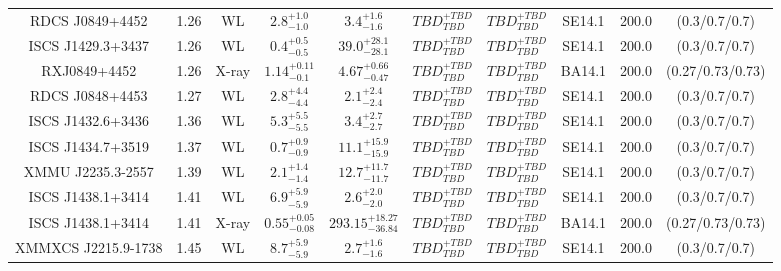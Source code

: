 \begin{table}
\begin{tabular}{cccccccccc}
RDCS J0849+4452 & 1.26 & WL & ${2.8}^{+1.0}_{-1.0}$ & ${3.4}^{+1.6}_{-1.6}$ & ${TBD}^{+TBD}_{TBD}$ & ${TBD}^{+TBD}_{TBD}$ & SE14.1 & 200.0 & (0.3/0.7/0.7) \\
ISCS J1429.3+3437 & 1.26 & WL & ${0.4}^{+0.5}_{-0.5}$ & ${39.0}^{+28.1}_{-28.1}$ & ${TBD}^{+TBD}_{TBD}$ & ${TBD}^{+TBD}_{TBD}$ & SE14.1 & 200.0 & (0.3/0.7/0.7) \\
RXJ0849+4452 & 1.26 & X-ray & ${1.14}^{+0.11}_{-0.1}$ & ${4.67}^{+0.66}_{-0.47}$ & ${TBD}^{+TBD}_{TBD}$ & ${TBD}^{+TBD}_{TBD}$ & BA14.1 & 200.0 & (0.27/0.73/0.73) \\
RDCS J0848+4453 & 1.27 & WL & ${2.8}^{+4.4}_{-4.4}$ & ${2.1}^{+2.4}_{-2.4}$ & ${TBD}^{+TBD}_{TBD}$ & ${TBD}^{+TBD}_{TBD}$ & SE14.1 & 200.0 & (0.3/0.7/0.7) \\
ISCS J1432.6+3436 & 1.36 & WL & ${5.3}^{+5.5}_{-5.5}$ & ${3.4}^{+2.7}_{-2.7}$ & ${TBD}^{+TBD}_{TBD}$ & ${TBD}^{+TBD}_{TBD}$ & SE14.1 & 200.0 & (0.3/0.7/0.7) \\
ISCS J1434.7+3519 & 1.37 & WL & ${0.7}^{+0.9}_{-0.9}$ & ${11.1}^{+15.9}_{-15.9}$ & ${TBD}^{+TBD}_{TBD}$ & ${TBD}^{+TBD}_{TBD}$ & SE14.1 & 200.0 & (0.3/0.7/0.7) \\
XMMU J2235.3-2557 & 1.39 & WL & ${2.1}^{+1.4}_{-1.4}$ & ${12.7}^{+11.7}_{-11.7}$ & ${TBD}^{+TBD}_{TBD}$ & ${TBD}^{+TBD}_{TBD}$ & SE14.1 & 200.0 & (0.3/0.7/0.7) \\
ISCS J1438.1+3414 & 1.41 & WL & ${6.9}^{+5.9}_{-5.9}$ & ${2.6}^{+2.0}_{-2.0}$ & ${TBD}^{+TBD}_{TBD}$ & ${TBD}^{+TBD}_{TBD}$ & SE14.1 & 200.0 & (0.3/0.7/0.7) \\
ISCS J1438.1+3414 & 1.41 & X-ray & ${0.55}^{+0.05}_{-0.08}$ & ${293.15}^{+18.27}_{-36.84}$ & ${TBD}^{+TBD}_{TBD}$ & ${TBD}^{+TBD}_{TBD}$ & BA14.1 & 200.0 & (0.27/0.73/0.73) \\
XMMXCS J2215.9-1738 & 1.45 & WL & ${8.7}^{+5.9}_{-5.9}$ & ${2.7}^{+1.6}_{-1.6}$ & ${TBD}^{+TBD}_{TBD}$ & ${TBD}^{+TBD}_{TBD}$ & SE14.1 & 200.0 & (0.3/0.7/0.7) \\
\end{tabular}
\end{table}
